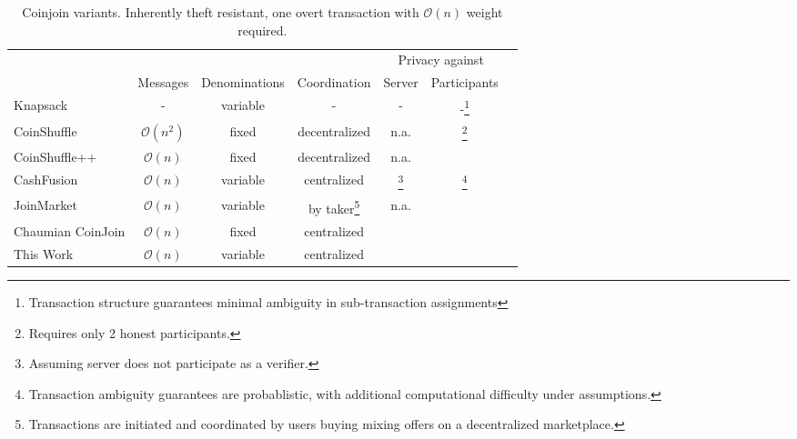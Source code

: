 \documentclass[a4paper]{article}
\renewcommand*{\thefootnote}{\arabic{footnote}}
\newcommand{\cmark}{\ding{51}}%
\begin{document}
\begin{table}[h!]
\begin{minipage}{\textwidth}
\renewcommand{\thempfootnote}{\fnsymbol{mpfootnote}}
\renewcommand{\thefootnote}{\thempfootnote} %
\centering
\begin{tabular}{lcccccc}
	&&&& \multicolumn{2}{c}{Privacy against}  \\
	&Messages & Denominations & Coordination & Server & Participants \\

	Knapsack~\cite{maurer2017anonymous} & - & variable & - & - & -\footnote{Transaction structure guarantees minimal ambiguity in sub-transaction assignments} \\
	CoinShuffle~\cite{ruffing2014coinshuffle} &$\mathcal{O}(n^2)$ & fixed & decentralized & n.a. & \cmark\footnote{Requires only 2 honest participants.} \\
	CoinShuffle++~\cite{ruffing2017p2p} & $\mathcal{O}(n)$ & fixed & decentralized & n.a. & \cmark\footnotemark[\value{footnote}] \\
	CashFusion & $\mathcal{O}(n)$ & variable & centralized & \cmark\footnote{Assuming server does not participate as a verifier.} & \cmark\footnote{Transaction ambiguity guarantees are probablistic, with additional computational difficulty under assumptions.} \\
	JoinMarket & $\mathcal{O}(n)$ & variable & by taker\footnote{Transactions are initiated and coordinated by users buying mixing offers on a decentralized marketplace.} & n.a.\footnotemark[\value{footnote}] & \cmark \\
	Chaumian CoinJoin & $\mathcal{O}(n)$ & fixed & centralized & \cmark & \cmark \\
	This Work & $\mathcal{O}(n)$ & variable & centralized & \cmark & \cmark \\
\end{tabular}
\end{minipage}
\caption{Coinjoin variants. Inherently theft resistant, one overt transaction with $\mathcal{O}(n)$ weight required.}
\label{table:coinjoin}
\end{table}
\end{document}
